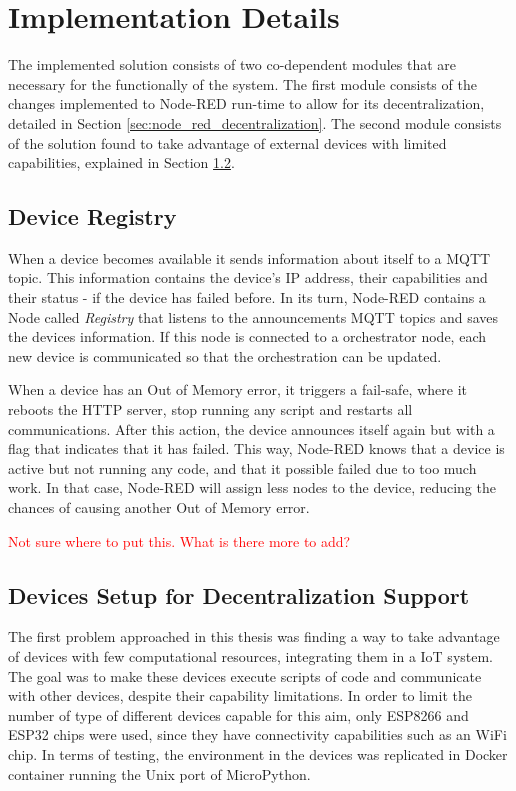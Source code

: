 \section{Implementation Details}\label{sec:implementation_details}

The implemented solution consists of two co-dependent modules that are necessary for the functionally of the system. The first module consists of the changes implemented to Node-RED run-time to allow for its decentralization, detailed in Section \ref{sec:node_red_decentralization}. The second module consists of the solution found to take advantage of external devices with limited capabilities, explained in Section \ref{sec:devices_decentralization}.

\subsection{Device Registry}\label{sec:registry}

When a device becomes available it sends information about itself to a MQTT topic. This information contains the device's IP address, their capabilities and their status - if the device has failed before. In its turn, Node-RED contains a Node called \textit{Registry} that listens to the announcements MQTT topics and saves the devices information. If this node is connected to a orchestrator node, each new device is communicated so that the orchestration can be updated.

When a device has an Out of Memory error, it triggers a fail-safe, where it reboots the HTTP server, stop running any script and restarts all communications. After this action, the device announces itself again but with a flag that indicates that it has failed. This way, Node-RED knows that a device is active but not running any code, and that it possible failed due to too much work. In that case, Node-RED will assign less nodes to the device, reducing the chances of causing another Out of Memory error.

\textcolor{red}{Not sure where to put this. What is there more to add?}

\subsection{Devices Setup for Decentralization Support}\label{sec:devices_decentralization}

The first problem approached in this thesis was finding a way to take advantage of devices with few computational resources, integrating them in a IoT system. The goal was to make these devices execute scripts of code and communicate with other devices, despite their capability limitations. In order to limit the number of type of different devices capable for this aim, only ESP8266 and ESP32 chips were used, since they have connectivity capabilities such as an WiFi chip. In terms of testing, the environment in the devices was replicated in Docker container running the Unix port of MicroPython.

